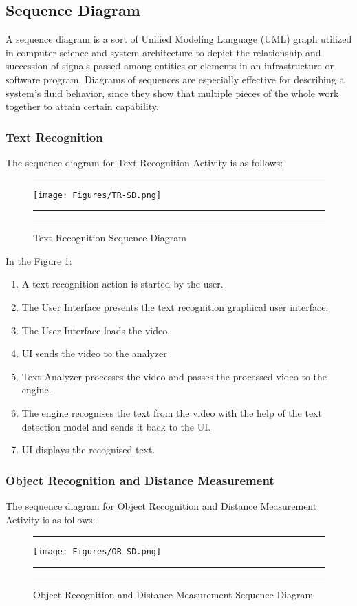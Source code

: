 \documentclass[MScCS]{uccthesis}
\begin{document}
   \subsection{Sequence Diagram}
   A sequence diagram is a sort of Unified Modeling Language (UML) graph utilized in computer science and system architecture to depict the relationship and succession of signals passed among entities or elements in an infrastructure or software program. Diagrams of sequences are especially effective for describing a system's fluid behavior, since they show that multiple pieces of the whole work together to attain certain capability.
   \newpage
   \subsubsection{Text Recognition}
   The sequence diagram for Text Recognition Activity is as follows:- 
   \begin{figure}[H]
      \hrule
      \vspace{0.5em}
     \centering
      \texttt{[image: Figures/TR-SD.png]}
      \vspace{0.5em}
      \hrule
      \caption{\centering\label{fig:TR-SD}Text Recognition Sequence Diagram}
      \vspace{0.5em}
      \hrule
   \end{figure}

   In the Figure \ref{fig:TR-SD}:
\begin{enumerate}
    \item A text recognition action is started by the user.
    \item The User Interface presents the text recognition graphical user interface.
    \item The User Interface loads the video.
    \item UI sends the video to the analyzer 
    \item Text Analyzer processes the video and passes the processed video to the engine.
    \item The engine recognises the text from the video with the help of the text detection model and sends it back to the UI.
    \item UI displays the recognised text.
\end{enumerate}
\newpage
\subsubsection{Object Recognition and Distance Measurement}
The sequence diagram for Object Recognition and Distance Measurement Activity is as follows:- 
\begin{figure}[H]
      \hrule
      \vspace{0.5em}
     \centering
      \texttt{[image: Figures/OR-SD.png]}
      \vspace{0.5em}
      \hrule
      \caption{\centering\label{fig:OR-SD}Object Recognition and Distance Measurement Sequence Diagram}
      \vspace{0.5em}
      \hrule
   \end{figure}
\end{document}
